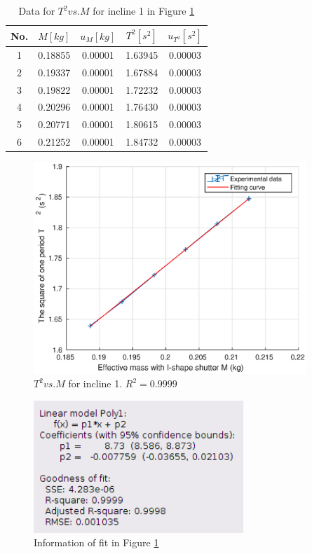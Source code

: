     \begin{table}
        \centering
        \begin{tabular}{|c|c|c|c|c|}
            \hline
            No. & $M[kg]$ & $u_{M}[kg]$ & $T^2[s^2]$ & $u_{T^2}[s^2]$\\ \hline
            1 & 0.18855 & 0.00001 & 1.63945 & 0.00003\\ \hline
            2 & 0.19337 & 0.00001 & 1.67884 & 0.00003\\ \hline
            3 & 0.19822 & 0.00001 & 1.72232 & 0.00003\\ \hline
            4 & 0.20296 & 0.00001 & 1.76430 & 0.00003\\ \hline
            5 & 0.20771 & 0.00001 & 1.80615 & 0.00003\\ \hline
            6 & 0.21252 & 0.00001 & 1.84732 & 0.00003\\ \hline
        \end{tabular}
        \caption{Data for $T^2 vs. M$ for incline 1 in Figure \ref{tmi1}}\label{tmi1data}
    \end{table}
    \begin{figure}[!h]
        \centering
        \includegraphics[height=8cm]{images/tmi1.eps}
        \caption{$T^2 vs. M$ for incline 1. $R^2=0.9999$}\label{tmi1}
    \end{figure}
    \begin{figure}[!h]
        \centering
        \includegraphics[height=5cm]{images/tmi1info.png}
        \caption{Information of fit in Figure \ref{tmi1}}\label{tmi1info}
    \end{figure}
